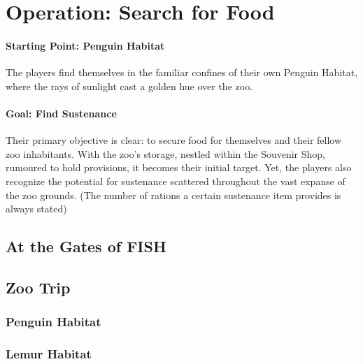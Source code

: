 
\chapter*{Operation: Search for Food}
\subsubsection*{Starting Point: Penguin Habitat}
{\entryfont The players find themselves in the familiar confines of their own  Penguin Habitat, where the rays of sunlight cast a golden hue over the zoo.}
\subsubsection*{Goal: Find Sustenance}
{\entryfont Their primary objective is clear: to secure food for themselves and their fellow zoo inhabitants. With the zoo's storage, nestled within the  Souvenir Shop, rumoured to hold provisions, it becomes their initial target. Yet, the players also recognize the potential for sustenance scattered throughout the vast expanse of the zoo grounds. (The number of rations a certain sustenance item provides is always stated)}

\section*{At the Gates of FISH}

\section*{Zoo Trip}

\subsection*{ Penguin Habitat}

\subsection*{ Lemur Habitat}

